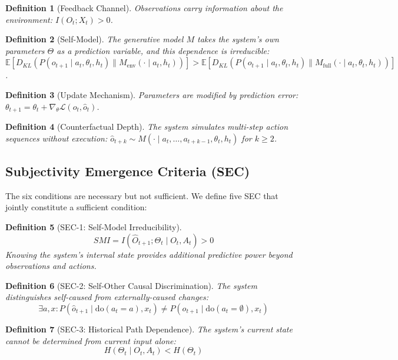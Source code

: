 \documentclass[11pt,a4paper]{article}
\newtheorem{definition}{Definition}
\begin{document}
\begin{definition}[Feedback Channel]
Observations carry information about the environment: $I(O_t; X_t) > 0$.
\end{definition}

\begin{definition}[Self-Model]
The generative model $M$ takes the system's own parameters $\Theta$ as a prediction variable, and this dependence is irreducible: $\mathbb{E}[D_{KL}(P(o_{t+1} \mid a_t, \theta_t, h_t) \| M_{\text{env}}(\cdot \mid a_t, h_t))] > \mathbb{E}[D_{KL}(P(o_{t+1} \mid a_t, \theta_t, h_t) \| M_{\text{full}}(\cdot \mid a_t, \theta_t, h_t))]$.
\end{definition}

\begin{definition}[Update Mechanism]
Parameters are modified by prediction error: $\theta_{t+1} = \theta_t + \nabla_\theta \mathcal{L}(o_t, \hat{o}_t)$.
\end{definition}

\begin{definition}[Counterfactual Depth]
The system simulates multi-step action sequences without execution: $\hat{o}_{t+k} \sim M(\cdot \mid a_t, \ldots, a_{t+k-1}, \theta_t, h_t)$ for $k \geq 2$.
\end{definition}

\subsection{Subjectivity Emergence Criteria (SEC)}

The six conditions are necessary but not sufficient. We define five SEC that jointly constitute a sufficient condition:

\begin{definition}[SEC-1: Self-Model Irreducibility]
$$SMI = I(\hat{O}_{t+1}; \Theta_t \mid O_t, A_t) > 0$$
Knowing the system's internal state provides additional predictive power beyond observations and actions.
\end{definition}

\begin{definition}[SEC-2: Self-Other Causal Discrimination]
The system distinguishes self-caused from externally-caused changes:
$$\exists a, x: P(\hat{o}_{t+1} \mid \text{do}(a_t = a), x_t) \neq P(\hat{o}_{t+1} \mid \text{do}(a_t = \emptyset), x_t)$$
\end{definition}

\begin{definition}[SEC-3: Historical Path Dependence]
The system's current state cannot be determined from current input alone:
$$H(\Theta_t \mid O_t, A_t) < H(\Theta_t)$$
\end{definition}
\end{document}
